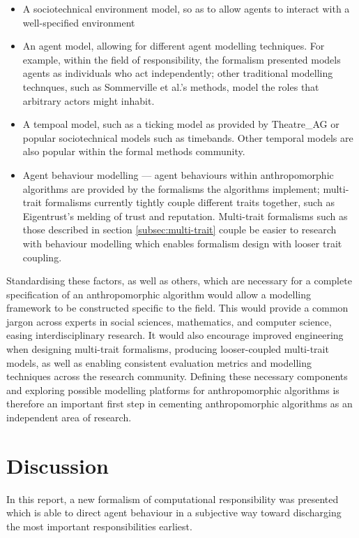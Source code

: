 \begin{itemize}
    \item A sociotechnical environment model, so as to allow agents to interact with a well-specified environment
    \item An agent model, allowing for different agent modelling techniques. For example, within the field of responsibility, the formalism presented models agents as individuals who act independently; other traditional modelling technques, such as Sommerville et al.'s methods, model the roles that arbitrary actors might inhabit.
    \item A tempoal model, such as a ticking model as provided by Theatre\_AG or popular sociotechnical models such as timebands\cite{Burns2006}. Other temporal models are also popular within the formal methods community.
    \item Agent behaviour modelling --- agent behaviours within anthropomorphic algorithms are provided by the formalisms the algorithms implement; multi-trait formalisms currently tightly couple different traits together, such as Eigentrust's melding of trust and reputation. Multi-trait formalisms such as those described in section \ref{subsec:multi-trait} couple be easier to research with behaviour modelling which enables formalism design with looser trait coupling.
\end{itemize}

Standardising these factors, as well as others, which are necessary for a complete specification of an anthropomorphic algorithm would allow a modelling framework to be constructed specific to the field. This would provide a common jargon across experts in social sciences, mathematics, and computer science, easing interdisciplinary research. It would also encourage improved engineering when designing multi-trait formalisms, producing looser-coupled multi-trait models, as well as enabling consistent evaluation metrics and modelling techniques across the research community. Defining these necessary components and exploring possible modelling platforms for anthropomorphic algorithms is therefore an important first step in cementing anthropomorphic algorithms as an independent area of research.\par

\section{Discussion}\label{sec:discussion}
In this report, a new formalism of computational responsibility was presented which is able to direct agent behaviour in a subjective way toward discharging the most important responsibilities earliest.\par

